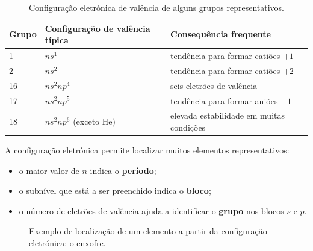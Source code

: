 \documentclass[11pt,a4paper,oneside]{book}
\begin{document}
\begin{table}[H]
\centering
\caption{Configuração eletrónica de valência de alguns grupos representativos.}
\begin{tabular}{lll}
\toprule
Grupo & Configuração de valência típica & Consequência frequente \\
\midrule
1 & $ns^1$ & tendência para formar catiões $+1$ \\
2 & $ns^2$ & tendência para formar catiões $+2$ \\
16 & $ns^2np^4$ & seis eletrões de valência \\
17 & $ns^2np^5$ & tendência para formar aniões $-1$ \\
18 & $ns^2np^6$ (exceto He) & elevada estabilidade em muitas condições \\
\bottomrule
\end{tabular}
\end{table}

A configuração eletrónica permite localizar muitos elementos representativos:
\begin{itemize}
  \item o maior valor de $n$ indica o \textbf{período};
  \item o subnível que está a ser preenchido indica o \textbf{bloco};
  \item o número de eletrões de valência ajuda a identificar o \textbf{grupo} nos blocos $s$ e $p$.
\end{itemize}

\begin{figure}[H]
\centering
{}
\caption{Exemplo de localização de um elemento a partir da configuração eletrónica: o enxofre.}
\end{figure}
\end{document}
